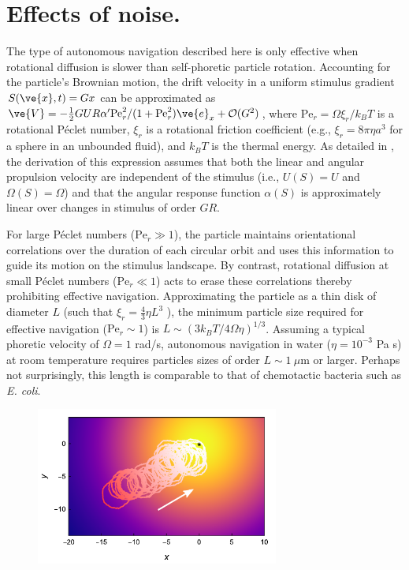 \section{Effects of noise.} 
The type of autonomous navigation described here is only effective when rotational diffusion is slower than self-phoretic particle rotation.  Accounting for the particle's Brownian motion, the drift velocity in a uniform stimulus gradient $S(\ve{x},t)=G x$ can be approximated as $\ve{V}=-\tfrac{1}{2} G U R \alpha' \text{Pe}^2_r / (1+ \text{Pe}_r^2) \ve{e}_x +\mathcal{O}(G^2)$, where $\text{Pe}_r =\Omega\xi_r/k_B T$ is a rotational P\'eclet number, $\xi_r$ is a rotational friction coefficient (e.g., $\xi_r=8\pi\eta a^3$ for a sphere in an unbounded fluid), and $k_B T$ is the thermal energy.  As detailed in \cite{Supp}, the derivation of this expression assumes that both the linear and angular propulsion velocity are independent of the stimulus (i.e., $U(S)=U$ and $\Omega(S)=\Omega$) and that the angular response function $\alpha(S)$ is approximately linear over changes in stimulus of order $GR$.  

For large P\'eclet numbers ($\text{Pe}_r\gg1$), the particle maintains orientational correlations over the duration of each circular orbit and uses this information to guide its motion on the stimulus landscape.  By contrast, rotational diffusion at small P\'eclet numbers ($\text{Pe}_r\ll1$) acts to erase these correlations thereby prohibiting effective navigation. Approximating the particle as a thin disk of diameter $L$ (such that $\xi_r=\tfrac{4}{3}\eta L^3$ \cite{Kim2005}), the minimum particle size required for effective navigation ($\text{Pe}_r\sim1$) is $L\sim(3k_B T/4\Omega\eta)^{1/3}$.  Assuming a typical phoretic velocity of $\Omega=1$ rad/s, autonomous navigation in water ($\eta=10^{-3}$ Pa s) at room temperature requires particles sizes of order $L\sim 1~\mu$m or larger. Perhaps not surprisingly, this length is comparable to that of chemotactic bacteria such as \emph{E. coli}. 

\begin{figure}[h!]
     \centering
     \includegraphics[width=8cm]{figures/4_4.pdf}
     \caption{}
     \label{fig:4}
 \end{figure}

